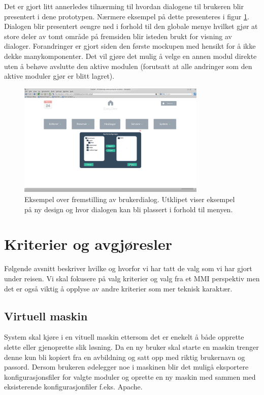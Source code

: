 Det er gjort litt annerledes tilnærming til hvordan dialogene til brukeren blir presentert i dene prototypen. Nærmere eksempel på dette presenteres i figur \ref{fig:hifi_brukerdialog}. Dialogen blir presentert øengre ned i forhold til den globale menye hvilket gjør at store deler av tomt område på fremsiden blir isteden brukt for visning av dialoger. Forandringer er gjort siden den første mockupen med hensikt for å ikke dekke manykomponenter. Det vil gjøre det mulig å velge en annen modul direkte uten å behøve avslutte den aktive modulen (forutsatt at alle andringer som den aktive moduler gjør er blitt lagret).

\begin{figure}[ht]
\centering
\includegraphics[width=0.8\textwidth,keepaspectratio,trim = {12cm 6cm 12cm 8cm}, clip]{./img/prosessdokumentasjon/hifi/a2.png}
\caption[Hi-fi brukerdialog]{Eksempel over fremstilling av brukerdialog. Utklipet viser eksempel på ny design og hvor dialogen kan bli plassert i forhold til menyen.}
\label{fig:hifi_brukerdialog}
\end{figure}

\section{Kriterier og avgjøresler}
Følgende avsnitt beskriver hvilke og hvorfor vi har tatt de valg som vi har gjort under reisen. Vi skal fokusere på valg kriterier og valg fra et MMI perspektiv men det er også viktig å opplyse av andre kriterier som mer teknisk karaktær.

\subsection{Virtuell maskin}
System skal kjøre i en vituell maskin ettersom det er enekelt å både opprette slette eller gjenoprette slik løsning. Da en ny bruker skal starte en maskin trenger denne kun bli kopiert fra en avbildning og satt opp med riktig brukernavn og passord. Dersom brukeren ødelegger noe i maskinen blir det muligå eksportere konfigurasjonsfiler for valgte moduler og oprette en ny maskin med sammen med eksisterende konfigurasjonfiler f.eks. Apache.

